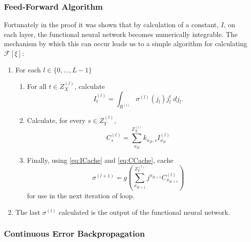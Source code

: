 \documentclass[titlepage, twoside]{article}
\numberwithin{equation}{subsection}
\numberwithin{theorem}{subsection}
\begin{document}
    
    \subsubsection{Feed-Forward Algorithm}
    Fortunately in the proof it was shown that by calculation of a constant, $I$, on each layer, the functional neural network becomes numerically integrable. The mechanism by which this can occur leads us to a simple algorithm for calculating
    $\mathcal{F}[\xi]$:
    
    \begin{enumerate}
    \item  For each $l \in \{0,\dots,L-1\}$
      \begin{enumerate}
      \item For all $t \in Z^{(l)}_X$, calculate
         \begin{equation} \label{eq:ICache} 
            I^{(l)}_t = \int_{R^{(l)}} \sigma^{(l)}(j_l)j_l^{t}\;dj_l.
         \end{equation}

       \item Calculate, for every $s \in Z^{(l)}_Y$,
         \begin{equation} \label{eq:CCache}
            C^{(l)}_{s} = \sum_{x_{2l}}^{Z^{(l)}_X} k_{x_{2l},s} I^{(l)}_{x_{2l}} 
         \end{equation}

        \item Finally, using \eqref{eq:ICache} and \eqref{eq:CCache}, cache 
          \begin{equation}
            \sigma^{(l+1)}=g\left(\sum_{x_{2l+1}}^{Z^{(l)}_Y} j^{x_{2l+1}} C^{(l)}_{x_{2l+1}}\right)
          \end{equation}
          for use in the next iteration of loop.
      \end{enumerate}
      \item The last $\sigma^{(l)}$ calculated is the output of the functional neural network.
    \end{enumerate}











\subsubsection{Continuous Error Backpropagation}
\end{document}
